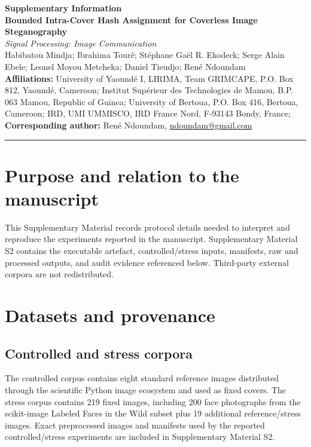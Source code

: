 ﻿\documentclass[11pt,a4paper]{article}
\begin{document}
\begin{center}
{\Large\bfseries Supplementary Information}\\[6pt]
{\large\bfseries Bounded Intra-Cover Hash Assignment for Coverless Image Steganography}\\[5pt]
\textit{Signal Processing: Image Communication}\\[10pt]
Habibatou Mindja; Ibrahima Tour\'e; St\'ephane Ga\"el R. Ekodeck; Serge Alain Ebele; Leonel Moyou Metcheka; Daniel Tieudjo; Ren\'e Ndoundam\\[8pt]
\textbf{Affiliations:} University of Yaound\'e I, LIRIMA, Team GRIMCAPE, P.O. Box 812, Yaound\'e, Cameroon; Institut Sup\'erieur des Technologies de Mamou, B.P. 063 Mamou, Republic of Guinea; University of Bertoua, P.O. Box 416, Bertoua, Cameroon; IRD, UMI UMMISCO, IRD France Nord, F-93143 Bondy, France;\\[5pt]
\textbf{Corresponding author:} Ren\'e Ndoundam, \href{mailto:ndoundam@gmail.com}{ndoundam@gmail.com}
\end{center}

\hrule
\vspace{7pt}

\section{Purpose and relation to the manuscript}
This Supplementary Material records protocol details needed to interpret and reproduce the experiments reported in the manuscript. Supplementary Material S2 contains the executable artefact, controlled/stress inputs, manifests, raw and processed outputs, and audit evidence referenced below. Third-party external corpora are not redistributed.


\section{Datasets and provenance}
\subsection{Controlled and stress corpora}
The controlled corpus contains eight standard reference images distributed through the scientific Python image ecosystem and used as fixed covers. The stress corpus contains 219 fixed images, including 200 face photographs from the scikit-image Labeled Faces in the Wild subset plus 19 additional reference/stress images. Exact preprocessed images and manifests used by the reported controlled/stress experiments are included in Supplementary Material S2.
\end{document}
